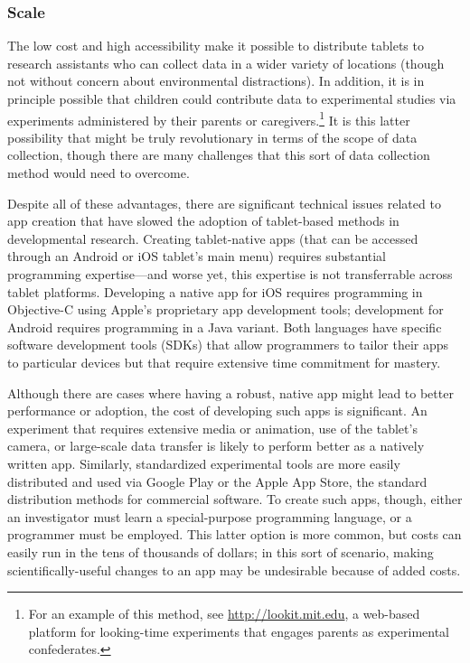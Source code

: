 \documentclass[man,noapacite]{apa2}
\begin{document}
\subsubsection{Scale} The low cost and high accessibility make it possible to distribute tablets to research assistants who can collect data in a wider variety of locations (though not without concern about environmental distractions). In addition, it is in principle possible that children could contribute data to experimental studies via experiments administered by their parents or caregivers.\footnote{For an example of this method, see \url{http://lookit.mit.edu}, a web-based platform for looking-time experiments that engages parents as experimental confederates.} It is this latter possibility that might be truly revolutionary in terms of the scope of data collection, though there are many challenges that this sort of data collection method would need to overcome.

Despite all of these advantages, there are significant technical issues related to app creation that have slowed the adoption of tablet-based methods in developmental research. Creating tablet-native apps (that can be accessed through an Android or iOS tablet's main menu) requires substantial programming expertise---and worse yet, this expertise is not transferrable across tablet platforms. Developing a native app for iOS requires programming in Objective-C using Apple's proprietary app development tools; development for Android requires programming in a Java variant. Both languages have specific software development tools (SDKs) that allow programmers to tailor their apps to particular devices but that require extensive time commitment for mastery. 

Although there are cases where having a robust, native app might lead to better performance or adoption, the cost of developing such apps is significant. An experiment that requires extensive media or animation, use of the tablet's camera, or large-scale data transfer is likely to perform better as a natively written app. Similarly, standardized experimental tools are more easily distributed and used via Google Play or the Apple App Store, the standard distribution methods for commercial software. To create such apps, though, either an investigator must learn a special-purpose programming language, or a programmer must be employed. This latter option is more common, but costs can easily run in the tens of thousands of dollars; in this sort of scenario, making scientifically-useful changes to an app may be undesirable because of added costs. 
\end{document}
